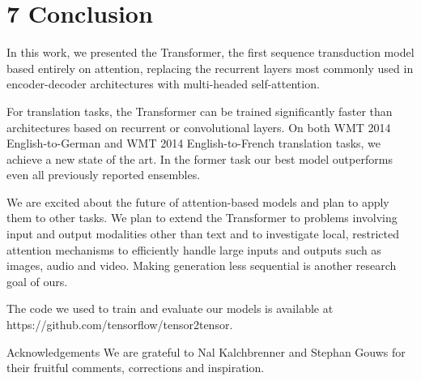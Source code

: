 \documentclass[conference]{IEEEtran}
\begin{document}
\section{7 Conclusion}

In this work, we presented the Transformer, the first sequence transduction model based entirely on attention, replacing the recurrent layers most commonly used in encoder-decoder architectures with multi-headed self-attention.

For translation tasks, the Transformer can be trained significantly faster than architectures based on recurrent or convolutional layers. On both WMT 2014 English-to-German and WMT 2014 English-to-French translation tasks, we achieve a new state of the art. In the former task our best model outperforms even all previously reported ensembles.

We are excited about the future of attention-based models and plan to apply them to other tasks. We plan to extend the Transformer to problems involving input and output modalities other than text and to investigate local, restricted attention mechanisms to efficiently handle large inputs and outputs such as images, audio and video. Making generation less sequential is another research goal of ours.

The code we used to train and evaluate our models is available at https://github.com/tensorflow/tensor2tensor.

Acknowledgements We are grateful to Nal Kalchbrenner and Stephan Gouws for their fruitful comments, corrections and inspiration.
\end{document}
